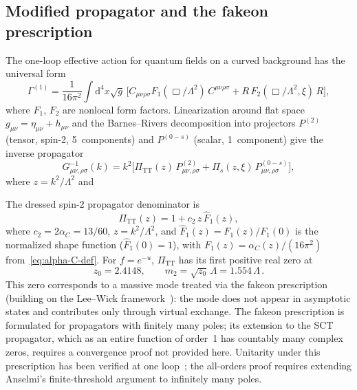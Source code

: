 \documentclass[12pt,a4paper]{article}
\theoremstyle{plain}
\theoremstyle{definition}
\theoremstyle{remark}
\newcommand{\dd}{\mathrm{d}}
\begin{document}
\subsection{Modified propagator and the fakeon prescription}
\label{sec:propagator}

The one-loop effective action for quantum fields on a curved
background has the universal form~\cite{BV:1987,BV:1990}
\begin{equation}\label{eq:Gamma1}
  \Gamma^{(1)} = \frac{1}{16\pi^2}\int \dd^4 x\sqrt{g}\,\bigl[
  C_{\mu\nu\rho\sigma} F_1(\Box/\Lambda^2)\, C^{\mu\nu\rho\sigma}
  + R\, F_2(\Box/\Lambda^2, \xi)\, R \bigr],
\end{equation}
where $F_1$, $F_2$ are nonlocal form factors.  Linearization
around flat space $g_{\mu\nu} = \eta_{\mu\nu} + h_{\mu\nu}$
and the Barnes--Rivers decomposition into projectors $P^{(2)}$
(tensor, spin-2, 5~components) and $P^{(0-s)}$ (scalar,
1~component) give the inverse propagator~\cite{BV:1987}
\begin{equation}\label{eq:inv-prop}
  G^{-1}_{\mu\nu,\rho\sigma}(k) = k^2\bigl[
  \Pi_{\mathrm{TT}}(z)\, P^{(2)}_{\mu\nu,\rho\sigma}
  + \Pi_s(z, \xi)\, P^{(0-s)}_{\mu\nu,\rho\sigma}\bigr],
\end{equation}
where $z = k^2/\Lambda^2$ and

The dressed spin-2 propagator denominator
is~\cite{BV:1987,Alfyorov:2026paper1}
\begin{equation}\label{eq:PiTT}
  \Pi_{\mathrm{TT}}(z) = 1 + c_2\, z\, \hat{F}_1(z),
\end{equation}
where $c_2 = 2\alpha_C = 13/60$, $z = k^2/\Lambda^2$, and
$\hat{F}_1(z) = F_1(z)/F_1(0)$ is the normalized shape function
($\hat{F}_1(0) = 1$), with $F_1(z) = \alpha_C(z)/(16\pi^2)$
from~\eqref{eq:alpha-C-def}.  For $f = e^{-u}$, $\Pi_{\mathrm{TT}}$
has its first positive real zero at
\begin{equation}\label{eq:z0}
  z_0 = 2.4148,\qquad
  m_2 = \sqrt{z_0}\,\Lambda = 1.554\,\Lambda\,.
\end{equation}
This zero corresponds to a massive mode treated via the fakeon
prescription~\cite{Anselmi:2017,Anselmi:2018} (building on
the Lee--Wick framework~\cite{LeeWick:1969}): the mode does
not appear in asymptotic states and contributes only through
virtual exchange.  The fakeon prescription is formulated for
propagators with finitely many poles; its extension to the SCT
propagator, which as an entire function of order~1 has countably
many complex zeros, requires a convergence proof not provided
here.  Unitarity under this prescription has been
verified at one loop~\cite{Alfyorov:2026paper1}; the all-orders
proof requires extending Anselmi's finite-threshold argument to
infinitely many poles.
\end{document}
